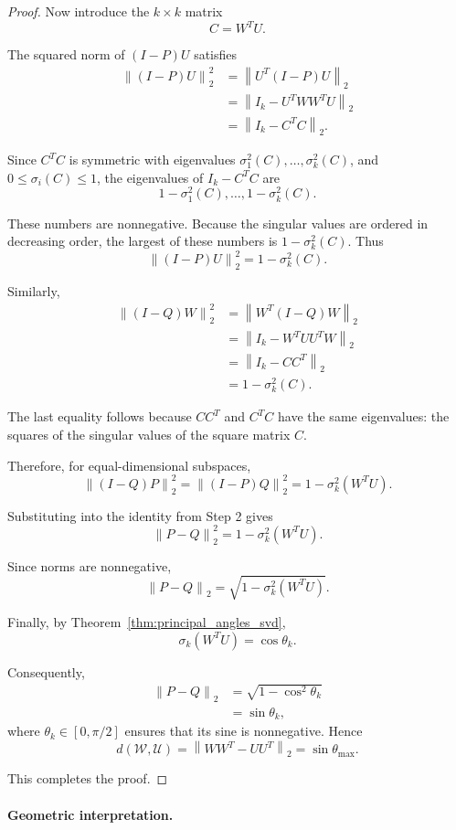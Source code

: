 \documentclass[14pt,letterpaper]{article}
\theoremstyle{plain}
\theoremstyle{definition}
\theoremstyle{remark}
\newcommand{\norm}[1]{\left\lVert #1 \right\rVert}
\begin{document}
\begin{proof}
Now introduce the $k\times k$ matrix
\[
C=W^TU.
\]

The squared norm of $(I-P)U$ satisfies
\[
\begin{aligned}
\norm{(I-P)U}_2^2
&=\norm{U^T(I-P)U}_2\\
&=\norm{I_k-U^TWW^TU}_2\\
&=\norm{I_k-C^TC}_2.
\end{aligned}
\]

Since $C^TC$ is symmetric with eigenvalues
$\sigma_1^2(C),\ldots,\sigma_k^2(C)$, and
$0\leq\sigma_i(C)\leq1$, the eigenvalues of
$I_k-C^TC$ are
\[
1-\sigma_1^2(C),\ldots,1-\sigma_k^2(C).
\]

These numbers are nonnegative. Because the singular
values are ordered in decreasing order, the largest
of these numbers is $1-\sigma_k^2(C)$. Thus
\[
\boxed{
\norm{(I-P)U}_2^2=1-\sigma_k^2(C).
}
\]

Similarly,
\[
\begin{aligned}
\norm{(I-Q)W}_2^2
&=\norm{W^T(I-Q)W}_2\\
&=\norm{I_k-W^TUU^TW}_2\\
&=\norm{I_k-CC^T}_2\\
&=1-\sigma_k^2(C).
\end{aligned}
\]

The last equality follows because $CC^T$ and $C^TC$
have the same eigenvalues: the squares of the singular
values of the square matrix $C$.

Therefore, for equal-dimensional subspaces,
\[
\boxed{
\norm{(I-Q)P}_2^2
=\norm{(I-P)Q}_2^2
=1-\sigma_k^2(W^TU).
}
\]

Substituting into the identity from Step 2 gives
\[
\norm{P-Q}_2^2=1-\sigma_k^2(W^TU).
\]

Since norms are nonnegative,
\[
\boxed{
\norm{P-Q}_2=\sqrt{1-\sigma_k^2(W^TU)}.
}
\]

Finally, by Theorem~\ref{thm:principal_angles_svd},
\[
\sigma_k(W^TU)=\cos\theta_k.
\]

Consequently,
\[
\begin{aligned}
\norm{P-Q}_2
&=\sqrt{1-\cos^2\theta_k}\\
&=\sin\theta_k,
\end{aligned}
\]
where $\theta_k\in[0,\pi/2]$ ensures that its sine
is nonnegative. Hence
\[
\boxed{
d(\mathcal W,\mathcal U)
=\norm{WW^T-UU^T}_2
=\sin\theta_{\max}.
}
\]

This completes the proof.
\end{proof}

\paragraph{Geometric interpretation.}
\end{document}
